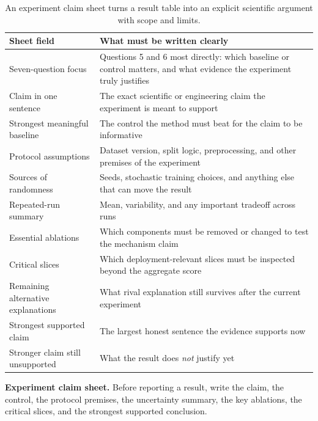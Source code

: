 \begin{table}[t]
\centering
\small
\setlength{\tabcolsep}{4pt}
\begin{tabular}{p{3.25cm}p{6.98cm}}
\toprule
Sheet field & What must be written clearly \\
\midrule
Seven-question focus & Questions 5 and 6 most directly: which baseline or control matters, and what evidence the experiment truly justifies \\
Claim in one sentence & The exact scientific or engineering claim the experiment is meant to support \\
Strongest meaningful baseline & The control the method must beat for the claim to be informative \\
Protocol assumptions & Dataset version, split logic, preprocessing, and other premises of the experiment \\
Sources of randomness & Seeds, stochastic training choices, and anything else that can move the result \\
Repeated-run summary & Mean, variability, and any important tradeoff across runs \\
Essential ablations & Which components must be removed or changed to test the mechanism claim \\
Critical slices & Which deployment-relevant slices must be inspected beyond the aggregate score \\
Remaining alternative explanations & What rival explanation still survives after the current experiment \\
Strongest supported claim & The largest honest sentence the evidence supports now \\
Stronger claim still unsupported & What the result does \emph{not} justify yet \\
\bottomrule
\end{tabular}
\caption{An experiment claim sheet turns a result table into an explicit scientific argument with scope and limits.}
\label{tab:experiment-claim-sheet}
\end{table}

\begin{thinkingtool}
\textbf{Experiment claim sheet.} Before reporting a result, write the claim, the control, the protocol premises, the uncertainty summary, the key ablations, the critical slices, and the strongest supported conclusion.
\end{thinkingtool}

